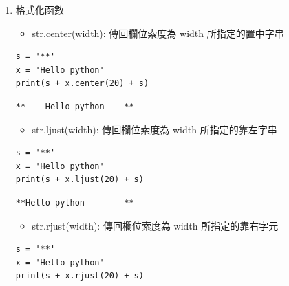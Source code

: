 \documentclass[a4paper,12pt]{article}
\begin{document}
\begin{enumerate}
\begin{verbatim}
Cogito, ergo sum
BCDEDCB
\end{verbatim}


\begin{itemize}
\item str.lstrip([chars]): 由字串*左側*刪除 chars，若省略 chars 則以空白進行切割\\
\item str.rstrip([chars]): 由字串*右側*刪除 chars，若省略 chars 則以空白進行切割\\
\end{itemize}

\item 格式化函數
\label{sec:orgfdcd19a}
\begin{itemize}
\item str.center(width): 傳回欄位索度為 width 所指定的置中字串\\
\end{itemize}
\lstset{breaklines=true,language=Python,label= ,caption= ,captionpos=b,firstnumber=1,numbers=left}
\begin{lstlisting}
s = '**'
x = 'Hello python'
print(s + x.center(20) + s)
\end{lstlisting}

\begin{verbatim}
**    Hello python    **
\end{verbatim}


\begin{itemize}
\item str.ljust(width): 傳回欄位索度為 width 所指定的靠左字串\\
\end{itemize}
\lstset{breaklines=true,language=Python,label= ,caption= ,captionpos=b,firstnumber=1,numbers=left}
\begin{lstlisting}
s = '**'
x = 'Hello python'
print(s + x.ljust(20) + s)
\end{lstlisting}

\begin{verbatim}
**Hello python        **
\end{verbatim}


\begin{itemize}
\item str.rjust(width): 傳回欄位索度為 width 所指定的靠右字元\\
\end{itemize}
\lstset{breaklines=true,language=Python,label= ,caption= ,captionpos=b,firstnumber=1,numbers=left}
\begin{lstlisting}
s = '**'
x = 'Hello python'
print(s + x.rjust(20) + s)
\end{lstlisting}


\end{enumerate}
\end{document}
